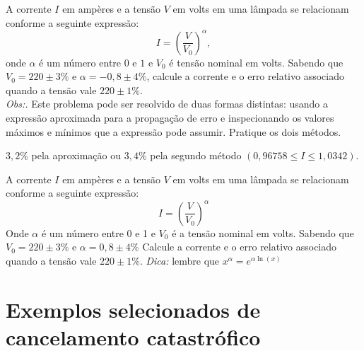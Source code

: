 \begin{exer} A corrente $I$ em ampères e a tensão $V$ em volts em uma lâmpada se relacionam conforme a seguinte expressão:
  \begin{equation*}
    I=\left(\frac{V}{V_0}\right)^\alpha,
  \end{equation*}
onde $\alpha$ é um número entre $0$ e $1$ e $V_0$ é tensão nominal em volts. Sabendo que $V_0=220\pm 3\%$ e $\alpha=-0,8\pm 4\%$, calcule a corrente e o erro relativo associado quando a tensão vale $220\pm 1\%$.\\
\emph{Obs:.} Este problema pode ser resolvido de duas formas distintas: usando a expressão aproximada para a propagação de erro e inspecionando os valores máximos e mínimos que a expressão pode assumir. Pratique os dois métodos.
\end{exer}
\begin{resp}
    $3,2\%$ pela aproximação ou $3,4\%$ pela segundo método  $\left(0,96758 \leq I\leq 1,0342\right)$.
\end{resp}

\begin{exer} A corrente $I$ em ampères e a tensão $V$ em volts em uma lâmpada se relacionam conforme a seguinte expressão:
$$I=\left(\frac{V}{V_0}\right)^\alpha$$
Onde $\alpha$ é um número entre 0 e 1 e $V_0$ é a tensão nominal em volts. Sabendo que $V_0=220\pm 3\%$ e $\alpha=0,8\pm 4\%$
Calcule a corrente e o erro relativo associado quando a tensão vale $220\pm 1\%$.
\emph{Dica:} lembre que $x^\alpha=e^{\alpha \ln(x)}$
\end{exer}

\section{Exemplos selecionados de cancelamento catastrófico}

